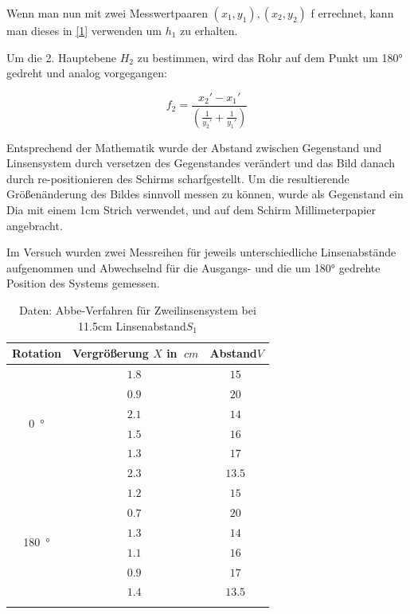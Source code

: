 Wenn man nun mit zwei Messwertpaaren $(x_1, y_1), (x_2, y_2)$ f errechnet, kann man dieses in \ref{1} verwenden um $h_1$ zu erhalten.

Um die 2. Hauptebene $H_2$ zu bestimmen, wird das Rohr auf dem Punkt um 180° gedreht und analog vorgegangen:

\begin{equation} \label{4}
    f_2 = \frac{x_2' - x_1'}{(\frac{1}{y_2'} + \frac{1}{y_1'})}
\end{equation}

Entsprechend der Mathematik wurde der Abstand zwischen Gegenstand und Linsensystem durch versetzen des Gegenstandes verändert und das Bild danach durch re-positionieren des Schirms scharfgestellt.
Um die resultierende Größenänderung des Bildes sinnvoll messen zu können, wurde als Gegenstand ein Dia mit einem 1cm Strich verwendet, und auf dem Schirm Millimeterpapier angebracht.

Im Versuch wurden zwei Messreihen für jeweils unterschiedliche Linsenabstände aufgenommen und Abwechselnd für die Ausgangs- und die um 180° gedrehte Position des Systems gemessen.

\begin{table}[h!]
    \begin{center}
        \caption{Daten: Abbe-Verfahren für Zweilinsensystem bei 11.5cm Linsenabstand$S_1$}
        \begin{tabular}{ccc}
            \hline
            Rotation   &  Vergrößerung  $X$ in $\SI{}{cm}$    & Abstand$V$ \\
            \hline
            \multirow{6}{*}{\SI{0}{\degree}}    & $\SI{1.8}{}$ & $\SI{15}{}$ \\
                                                & $\SI{0.9}{}$ & $\SI{20}{}$ \\
                                                & $\SI{2.1}{}$ & $\SI{14}{}$ \\
                                                & $\SI{1.5}{}$ & $\SI{16}{}$ \\
                                                & $\SI{1.3}{}$ & $\SI{17}{}$ \\
                                                & $\SI{2.3}{}$ & $\SI{13.5}{}$ \\
            \hline
            \multirow{6}{*}{\SI{180}{\degree}}  & $\SI{1.2}{}$ & $\SI{15}{}$ \\
                                                & $\SI{0.7}{}$ & $\SI{20}{}$ \\
                                                & $\SI{1.3}{}$ & $\SI{14}{}$ \\
                                                & $\SI{1.1}{}$ & $\SI{16}{}$ \\
                                                & $\SI{0.9}{}$ & $\SI{17}{}$ \\
                                                & $\SI{1.4}{}$ & $\SI{13.5}{}$ \\
            \hline
            \label{tab:Abbe1}
        \end{tabular}
    \end{center}
\end{table}

